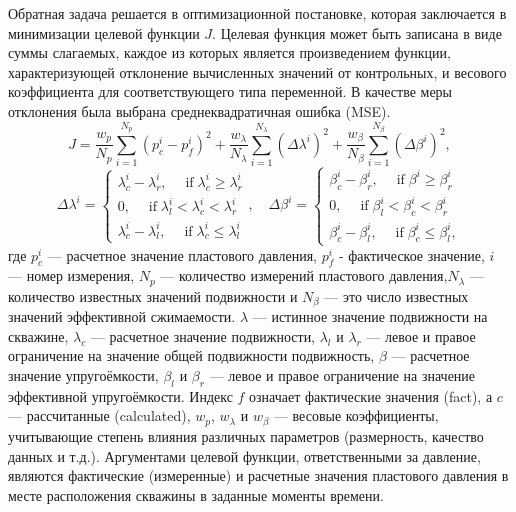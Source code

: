 \documentclass{article}
\begin{document}
Обратная задача решается в оптимизационной постановке, которая заключается в минимизации целевой функции $J$.
Целевая функция может быть записана в виде суммы слагаемых, каждое из которых является произведением функции, характеризующей отклонение вычисленных значений от контрольных, и весового коэффициента для соответствующего типа переменной. В качестве меры отклонения была выбрана среднеквадратичная ошибка (MSE).
\begin{equation} \label{mse}
	J=\frac{w_p}{N_p}\sum_{i=1}^{N_p}{\left(p_c^i-p_f^i\right)^2}+
	\frac{w_{\lambda}}{N_\lambda}\sum_{i=1}^{N_\lambda}{\left(\Delta\lambda^i  \right)^2}+
	\frac{w_{\beta}}{N_\beta}\sum_{i=1}^{N_\beta}{\left(\Delta\beta^i  \right)^2},
\end{equation}
\begin{equation} \label{mse1}
	\Delta\lambda^i  = \left\{\begin{array}{crl}
		\lambda^i_c - \lambda^i_r, \quad \;\mbox{if}\; \lambda^i_c \ge \lambda^i_r\\
		0,\quad \;\mbox{if}\; \lambda^i_l < \lambda^i_c < \lambda^i_r\\
		\lambda^i_c - \lambda^i_l, \quad \;\mbox{if}\;\lambda^i_c \le \lambda^i_l
	\end{array}\right.,
	\quad
	\Delta\beta^i  = \left\{\begin{array}{crl}
		\beta^i_c - \beta^i_r, \quad \;\mbox{if}\; \beta^i \ge \beta^i_r\\
		0,\quad \;\mbox{if}\; \beta^i_l < \beta^i_c < \beta^i_r\\
		\beta^i_c - \beta^i_l, \quad \;\mbox{if}\;\beta^i_c \le \beta^i_l,
	\end{array}\right.
\end{equation}	
где $p_c^i$ --- расчетное значение пластового давления, $p_f^i$
- фактическое значение, $i$ --- номер измерения, $N_p$ ---
количество измерений пластового давления,$N_\lambda$ ---
количество известных значений подвижности и $N_\beta$ --- это число известных значений эффективной сжимаемости. $\lambda$ --- истинное значение подвижности на скважине, $\lambda_c$ --- расчетное значение подвижности,  $\lambda_l$ и $\lambda_r$ --- левое и правое ограничение на значение общей подвижности подвижность, $\beta$ --- расчетное значение упругоёмкости,  $\beta_l$ и $\beta_r$ --- левое и правое ограничение на значение эффективной упругоёмкости.  
Индекс $f$ означает фактические значения (fact), а $c$ --- рассчитанные (calculated), $w_p$, $w_\lambda$ и $w_\beta$ --- весовые коэффициенты, учитывающие степень влияния различных параметров (размерность, качество данных и т.д.). Аргументами целевой функции, ответственными за давление, являются фактические (измеренные) и расчетные значения пластового давления в месте расположения скважины в заданные моменты времени.
\end{document}

